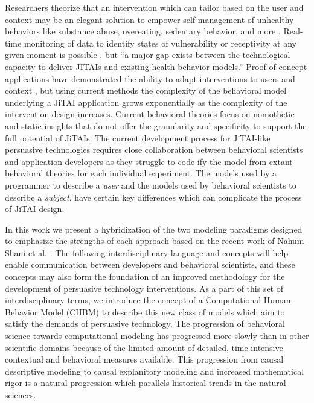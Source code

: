 \documentclass[runningheads,a4paper]{llncs}
\begin{document}
Researchers theorize that an intervention which can tailor based on the user and context may be an elegant solution to empower self-management of unhealthy behaviors like substance abuse, overeating, sedentary behavior, and more \cite{nahum2014, Hekler, Patrick, and Michie, 2016}.
Real-time monitoring of data to identify states of vulnerability or receptivity at any given moment is possible \cite{Hekler, Klasnja, Traver, and Hendriks, 2013}, but ``a major gap exists between the technological capacity to deliver JITAIs and existing health behavior models.'' \cite{nahum2014}
Proof-of-concept applications have demonstrated the ability to adapt interventions to users \cite{dallery2014optimizing, beck2010challenges} and context \cite{brailsford2010towards, collins2004}, but using current methods the complexity of the behavioral model underlying a JiTAI application grows exponentially as the complexity of the intervention design increases. 
Current behavioral theories focus on nomothetic and static insights that do not offer the granularity and specificity to support the full potential of JiTAIs\cite{riley2011health}.
The current development process for JiTAI-like persuasive technologies requires close collaboration between behavioral scientists and application developers as they struggle to code-ify the model from extant behavioral theories for each individual experiment.
The models used by a programmer to describe a \emph{user} and the models used by behavioral scientists to describe a \emph{subject}, have certain key differences which can complicate the process of JiTAI design.

In this work we present a hybridization of the two modeling paradigms designed to emphasize the strengths of each approach based on the recent work of Nahum-Shani et al. \cite{nahum2014}.
The following interdisciplinary language and concepts will help enable communication between developers and behavioral scientists, and these concepts may also form the foundation of an improved methodology for the development of persuasive technology interventions.
As a part of this set of interdisciplinary terms, we introduce the concept of a Computational Human Behavior Model (CHBM) to describe this new class of models which aim to satisfy the demands of persuasive technology.
The progression of behavioral science towards computational modeling has progressed more slowly than in other scientific domains because of the limited amount of detailed, time-intensive contextual and behavioral measures available.
This progression from causal descriptive modeling to causal explanitory modeling and increased mathematical rigor is a natural progression which parallels historical trends in the natural sciences.
\end{document}
